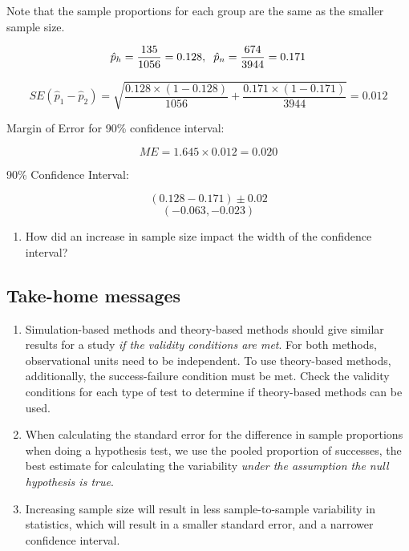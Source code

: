 \documentclass[
]{report}
\providecommand{\tightlist}{%
  \setlength{\itemsep}{0pt}\setlength{\parskip}{0pt}}
\begin{document}
Note that the sample proportions for each group are the same as the smaller sample size.

\[\hat{p}_h = \frac{135}{1056}=0.128, \hspace{2mm} \hat{p}_n = \frac{674}{3944}=0.171\]

\[SE(\hat{p}_1-\hat{p}_2) = \sqrt{\frac{0.128\times (1-0.128)}{1056}+\frac{0.171\times (1-0.171)}{3944}} = 0.012\]

Margin of Error for 90\% confidence interval:

\[ME = 1.645 \times 0.012 = 0.020\]

90\% Confidence Interval:

\[(0.128 - 0.171) \pm 0.02\]
\[(-0.063, -0.023)\]

\begin{enumerate}
\def\labelenumi{\arabic{enumi}.}
\setcounter{enumi}{4}
\tightlist
\item
  How did an increase in sample size impact the width of the confidence interval?
\end{enumerate}

\vspace{0.4in}

\vspace{.8in}

\subsection{Take-home messages}\label{take-home-messages-16}

\begin{enumerate}
\def\labelenumi{\arabic{enumi}.}
\item
  Simulation-based methods and theory-based methods should give similar results for a study \emph{if the validity conditions are met}. For both methods, observational units need to be independent. To use theory-based methods, additionally, the success-failure condition must be met. Check the validity conditions for each type of test to determine if theory-based methods can be used.
\item
  When calculating the standard error for the difference in sample proportions when doing a hypothesis test, we use the pooled proportion of successes, the best estimate for calculating the variability \emph{under the assumption the null hypothesis is true}.
\item
  Increasing sample size will result in less sample-to-sample variability in statistics, which will result in a smaller standard error, and a narrower confidence interval.
\end{enumerate}
\end{document}
